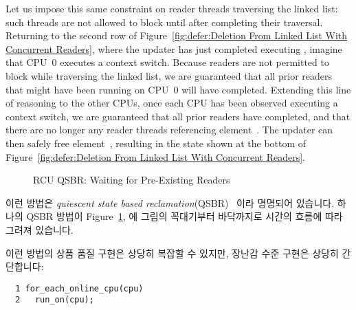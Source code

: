 Let us impose this same constraint on reader threads traversing the
linked list: such threads are not allowed to block until after
completing their traversal.
Returning to the second row of
Figure~\ref{fig:defer:Deletion From Linked List With Concurrent Readers},
where the updater has just completed executing ,
imagine that CPU~0 executes a context switch.
Because readers are not permitted to block while traversing the linked
list, we are guaranteed that all prior readers that might have been running on
CPU~0 will have completed.
Extending this line of reasoning to the other CPUs, once each CPU has
been observed executing a context switch, we are guaranteed that all
prior readers have completed, and that there are no longer any reader
threads referencing element~.
The updater can then safely free element~, resulting in the
state shown at the bottom of
Figure~\ref{fig:defer:Deletion From Linked List With Concurrent Readers}.
\fi

\begin{figure}[tb]
\centering
{}
\caption{RCU QSBR: Waiting for Pre-Existing Readers}
\label{fig:defer:RCU QSBR: Waiting for Pre-Existing Readers}
\end{figure}

이런 방법은 \emph{quiescent state based
reclamation}(QSBR)~\cite{ThomasEHart2006a} 이라 명명되어 있습니다.
하나의 QSBR 방법이
Figure~\ref{fig:defer:RCU QSBR: Waiting for Pre-Existing Readers},
에 그림의 꼭대기부터
바닥까지로 시간의 흐름에 따라 그려져 있습니다.

이런 방법의 상품 품질 구현은 상당히 복잡할 수 있지만, 장난감 수준 구현은 상당히
간단합니다:
\iffalse

This approach is termed \emph{quiescent state based reclamation}
(QSBR)~\cite{ThomasEHart2006a}.
A QSBR schematic is shown in
Figure~\ref{fig:defer:RCU QSBR: Waiting for Pre-Existing Readers},
with time advancing from the top of the figure to the bottom.

Although production-quality implementations of this approach can be
quite complex, a toy implementation is exceedingly simple:
\fi

\vspace{5pt}
\begin{minipage}[t]{\columnwidth}
\scriptsize
\begin{verbatim}
  1 for_each_online_cpu(cpu)
  2   run_on(cpu);
\end{verbatim}
\end{minipage}
\vspace{5pt}

